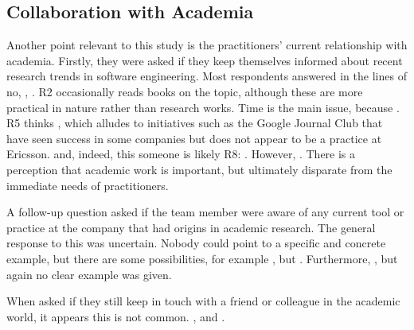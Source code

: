 \subsection{Collaboration with Academia}

Another point relevant to this study is the practitioners' current relationship with academia.
Firstly, they were asked if they keep themselves informed about recent research trends in software engineering.
Most respondents answered in the lines of no, , . 
R2 occasionally reads books on the topic, although these are more practical in nature rather than research works.
Time is the main issue, because .
R5 thinks , which alludes to initiatives such as the Google Journal Club \cite{googlejournal} that have seen success in some companies but does not appear to be a practice at Ericsson.
 and, indeed, this someone is likely R8: .
However, .
There is a perception that academic work is important, but ultimately disparate from the immediate needs of practitioners.

A follow-up question asked if the team member were aware of any current tool or practice at the company that had origins in academic research.
The general response to this was uncertain.
Nobody could point to a specific and concrete example, but there are some possibilities, for example , but .
Furthermore, , but again no clear example was given.

When asked if they still keep in touch with a friend or colleague in the academic world, it appears this is not common.
, and .

